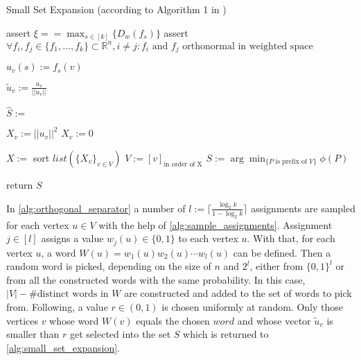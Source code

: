 \begin{algorithm}[H]
	\caption{Small Set Expansion (according to Algorithm 1 in \cite{ChanLTZ16}) \label{alg:small_set_expansion}} %
	
	
	\begin{algorithmic}
		\State assert $\xi == \max_{s\in [k]} \{D_w(f_s)\}$
		\State assert $\forall f_i, f_j \in \{f_1, \ldots , f_k\} \subset \mathbb{R}^n, i\neq j: f_i \text{ and } f_j \text{ orthonormal in weighted space} $
		
		\State	$u_v(s) := f_s(v) $
		\EndFor
		\EndFor
		
		\State $\tilde{u}_v := \frac{u_v}{||u_v||}$
		\EndFor
		
		\State $\hat{S} := $ 
		

		\State $X_v := ||u_v||^2$
		\Else
		\State $X_v := 0$
		\EndIf
		
		\EndFor
		\State $X:= $ sort $ list(\{X_v\}_{v \in V})$
		\State $V := [v]_{\text{in order of X}}$
		\State $S := \arg \min_{\{P \text{ is prefix of }V\}}\phi(P)$
		
		\State return $S$
		
	
	
		\EndFunction
		
		
	\end{algorithmic}
\end{algorithm} %


In \cref{alg:orthogonal_separator} a number of $l := \lceil \frac{\log_2 k}{1-\log_2 k}\rceil$ assignments are sampled for each vertex $u \in V$ with the help of \cref{alg:sample_assignments}. Assignment $j \in [l]$ assigns a value $w_j(u) \in \{0,1\}$ to each vertex $u$. With that, for each vertex $u$, a word $W(u) =  w_1(u)w_2(u)\cdots w_l(u)$ can be defined. Then a random word is picked, depending on the size of $n$ and $2^l$, either from $\{0,1\}^l$ or from all the constructed words with the same probability. In this case, $|V|-\# \text{distinct words in }W$ are constructed and added to the set of words to pick from. Following, a value $r\in(0,1)$ is chosen uniformly at random. Only those vertices $v$ whose word $W(v)$ equals the chosen $word$ and whose vector $\tilde{u}_v$ is smaller than $r$ get selected into the set $S$ which is returned to \cref{alg:small_set_expansion}.

